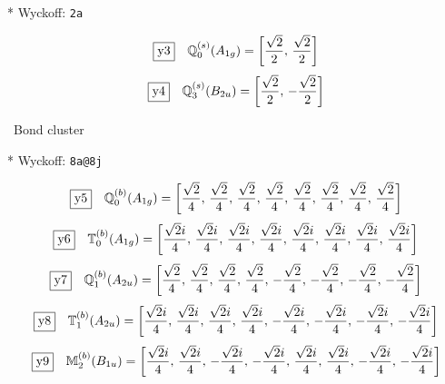 \documentclass[fleqn,10pt,landscape]{jsarticle}
\begin{document}
\noindent ** Wyckoff: \texttt{2a}

\begin{dmath*}
\fbox{y3}\quad \mathbb{Q}_{0}^{(s)}(A_{1g})=\left[ \frac{\sqrt{2}}{2},\, \frac{\sqrt{2}}{2} \right]
\end{dmath*}
\begin{dmath*}
\fbox{y4}\quad \mathbb{Q}_{3}^{(s)}(B_{2u})=\left[ \frac{\sqrt{2}}{2},\, - \frac{\sqrt{2}}{2} \right]
\end{dmath*}
\vspace{5mm}

\noindent\textbullet\, Bond cluster

\vspace{5mm}

\noindent ** Wyckoff: \texttt{8a@8j}

\begin{dmath*}
\fbox{y5}\quad \mathbb{Q}_{0}^{(b)}(A_{1g})=\left[ \frac{\sqrt{2}}{4},\, \frac{\sqrt{2}}{4},\, \frac{\sqrt{2}}{4},\, \frac{\sqrt{2}}{4},\, \frac{\sqrt{2}}{4},\, \frac{\sqrt{2}}{4},\, \frac{\sqrt{2}}{4},\, \frac{\sqrt{2}}{4} \right]
\end{dmath*}
\begin{dmath*}
\fbox{y6}\quad \mathbb{T}_{0}^{(b)}(A_{1g})=\left[ \frac{\sqrt{2} i}{4},\, \frac{\sqrt{2} i}{4},\, \frac{\sqrt{2} i}{4},\, \frac{\sqrt{2} i}{4},\, \frac{\sqrt{2} i}{4},\, \frac{\sqrt{2} i}{4},\, \frac{\sqrt{2} i}{4},\, \frac{\sqrt{2} i}{4} \right]
\end{dmath*}
\begin{dmath*}
\fbox{y7}\quad \mathbb{Q}_{1}^{(b)}(A_{2u})=\left[ \frac{\sqrt{2}}{4},\, \frac{\sqrt{2}}{4},\, \frac{\sqrt{2}}{4},\, \frac{\sqrt{2}}{4},\, - \frac{\sqrt{2}}{4},\, - \frac{\sqrt{2}}{4},\, - \frac{\sqrt{2}}{4},\, - \frac{\sqrt{2}}{4} \right]
\end{dmath*}
\begin{dmath*}
\fbox{y8}\quad \mathbb{T}_{1}^{(b)}(A_{2u})=\left[ \frac{\sqrt{2} i}{4},\, \frac{\sqrt{2} i}{4},\, \frac{\sqrt{2} i}{4},\, \frac{\sqrt{2} i}{4},\, - \frac{\sqrt{2} i}{4},\, - \frac{\sqrt{2} i}{4},\, - \frac{\sqrt{2} i}{4},\, - \frac{\sqrt{2} i}{4} \right]
\end{dmath*}
\begin{dmath*}
\fbox{y9}\quad \mathbb{M}_{2}^{(b)}(B_{1u})=\left[ \frac{\sqrt{2} i}{4},\, \frac{\sqrt{2} i}{4},\, - \frac{\sqrt{2} i}{4},\, - \frac{\sqrt{2} i}{4},\, \frac{\sqrt{2} i}{4},\, \frac{\sqrt{2} i}{4},\, - \frac{\sqrt{2} i}{4},\, - \frac{\sqrt{2} i}{4} \right]
\end{dmath*}
\end{document}
